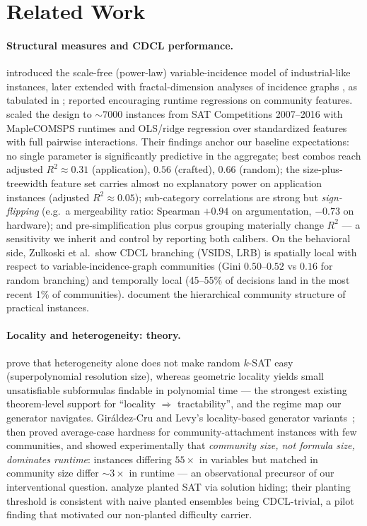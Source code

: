 \documentclass[manuscript, screen, review]{jair}
\begin{document}
\section{Related Work}
\label{sec:related}

\paragraph{Structural measures and CDCL performance.}
\citet{ansotegui2009} introduced the scale-free (power-law) variable-incidence
model of industrial-like instances, later extended with
fractal-dimension analyses of incidence graphs \parencite{ansotegui2014}, as
tabulated in \parencite{zulkoski2018}; \citet{newsham2014} reported encouraging
runtime regressions on
community features. \citet{zulkoski2018} scaled the design to
${\sim}7000$ instances from SAT Competitions 2007--2016 with MapleCOMSPS
runtimes and OLS/ridge regression over standardized features with full
pairwise interactions. Their findings anchor our baseline expectations:
no single parameter is significantly predictive in the aggregate; best
combos reach adjusted $R^2 \approx 0.31$ (application), $0.56$ (crafted),
$0.66$ (random); the size-plus-treewidth feature set carries almost no
explanatory power on application instances (adjusted $R^2 \approx 0.05$);
sub-category correlations are strong but \emph{sign-flipping}
(e.g.\ a mergeability ratio: Spearman $+0.94$ on argumentation, $-0.73$ on
hardware); and pre-simplification plus corpus grouping materially change
$R^2$ --- a sensitivity we inherit and control by reporting both calibers.
On the behavioral side, Zulkoski et al.\ show CDCL branching (VSIDS, LRB) is
spatially local with respect to variable-incidence-graph communities (Gini
$0.50$--$0.52$ vs $0.16$ for random branching) and temporally local (45--55\%
of decisions land in the most recent 1\% of communities). \citet{li2022}
document the hierarchical community structure of practical
instances.

\paragraph{Locality and heterogeneity: theory.}
\citet{blasius2022} prove that heterogeneity alone does not
make random $k$-SAT easy (superpolynomial resolution size), whereas geometric
locality yields small unsatisfiable subformulas findable in polynomial time ---
the strongest existing theorem-level support for ``locality $\Rightarrow$
tractability'', and the regime map our generator navigates.
Gir\'aldez-Cru and Levy's locality-based generator
variants~\cite{giraldez2017};
\citet{mull2016} then proved average-case hardness for
community-attachment instances with few communities, and showed
experimentally that \emph{community size, not formula size, dominates
runtime}: instances differing $55\times$ in variables but matched in community
size differ ${\sim}3\times$ in runtime --- an observational precursor of our
interventional question. \citet{jia2005} analyze planted
SAT via solution hiding; their planting threshold is consistent with naive planted
ensembles being CDCL-trivial, a pilot finding that motivated our non-planted
difficulty carrier.
\end{document}
